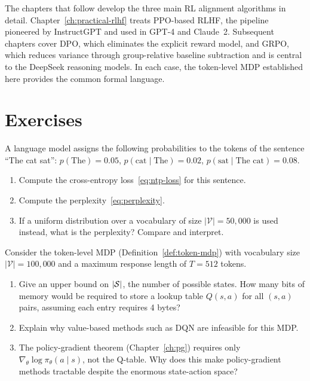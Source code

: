 The chapters that follow develop the three main RL alignment algorithms in detail. Chapter~\ref{ch:practical-rlhf} treats PPO-based RLHF, the pipeline pioneered by InstructGPT and used in GPT-4 and Claude~2. Subsequent chapters cover DPO, which eliminates the explicit reward model, and GRPO, which reduces variance through group-relative baseline subtraction and is central to the DeepSeek reasoning models. In each case, the token-level MDP established here provides the common formal language.

\section*{Exercises}

\begin{exercise}
\label{ex:lm-perplexity}
A language model assigns the following probabilities to the tokens of the sentence ``The cat sat'': $p(\text{The}) = 0.05$, $p(\text{cat} \mid \text{The}) = 0.02$, $p(\text{sat} \mid \text{The cat}) = 0.08$.
\begin{enumerate}
  \item Compute the cross-entropy loss~\eqref{eq:ntp-loss} for this sentence.
  \item Compute the perplexity~\eqref{eq:perplexity}.
  \item If a uniform distribution over a vocabulary of size $|\mathcal{V}| = 50{,}000$ is used instead, what is the perplexity? Compare and interpret.
\end{enumerate}
\end{exercise}

\begin{exercise}
\label{ex:token-mdp-size}
Consider the token-level MDP (Definition~\ref{def:token-mdp}) with vocabulary size $|\mathcal{V}| = 100{,}000$ and a maximum response length of $T = 512$ tokens.
\begin{enumerate}
  \item Give an upper bound on $|\mathcal{S}|$, the number of possible states. How many bits of memory would be required to store a lookup table $Q(s, a)$ for all $(s, a)$ pairs, assuming each entry requires 4 bytes?
  \item Explain why value-based methods such as DQN are infeasible for this MDP.
  \item The policy-gradient theorem (Chapter~\ref{ch:pg}) requires only $\nabla_\theta \log \pi_\theta(a \mid s)$, not the Q-table. Why does this make policy-gradient methods tractable despite the enormous state-action space?
\end{enumerate}
\end{exercise}

